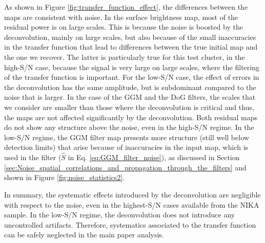 \documentclass[traditabstract]{aa}
\begin{document}
As shown in Figure \ref{fig:transfer_function_effect}, the differences between the maps are consistent with noise. In the surface brightness map, most of the residual power is on large scales. This is because the noise is boosted by the deconvolution, mainly on large scales, but also because of the small inaccuracies in the transfer function that lead to differences between the true initial map and the one we recover. The latter is particularly true for this test cluster, in the high-S/N case, because the signal is very large on large scales, where the filtering of the transfer function is important. For the low-S/N case, the effect of errors in the deconvolution has the same amplitude, but is subdominant compared to the noise that is larger. In the case of the GGM and the DoG filters, the scales that we consider are smaller than those where the deconvolution is critical and thus, the maps are not affected significantly by the deconvolution. Both residual maps do not show any structure above the noise, even in the high-S/N regime. In the low-S/N regime, the GGM filter map presents more structure (still well below detection limits) that arise because of inaccuracies in the input map, which is used in the filter ($\hat{S}$ in Eq. \ref{eq:GGM_filter_noise}), as discussed in Section \ref{sec:Noise_spatial_correlations_and_propagation_through_the_filters} and shown in Figure \ref{fig:noise_statistics2}.

In summary, the systematic effects introduced by the deconvolution are negligible with respect to the noise, even in the highest-S/N cases available from the NIKA sample. In the low-S/N regime, the deconvolution does not introduce any uncontrolled artifacts. Therefore, systematics associated to the transfer function can be safely neglected in the main paper analysis.
\end{document}
